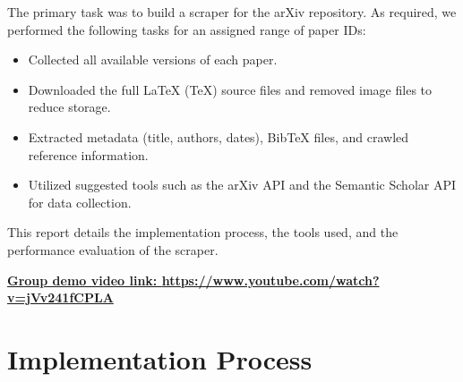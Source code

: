 \documentclass[12pt]{article}
\begin{document}
The primary task was to build a scraper for the arXiv repository. As required, we performed the following tasks for an assigned range of paper IDs:
\begin{itemize}
    \item Collected all available versions of each paper.

    \item Downloaded the full LaTeX (TeX) source files and removed image files to reduce storage.

    \item Extracted metadata (title, authors, dates), BibTeX files, and crawled reference information.

    \item Utilized suggested tools such as the arXiv API and the Semantic Scholar API for data collection.
\end{itemize}
This report details the implementation process, the tools used, and the performance evaluation of the scraper.

\begin{center}
    \href{https://www.youtube.com/watch?v=jVv241fCPLA\&feature=youtu.be}{\textbf{Group demo video link: \url{https://www.youtube.com/watch?v=jVv241fCPLA}}}
\end{center}

\newpage
\section{Implementation Process}
\end{document}
